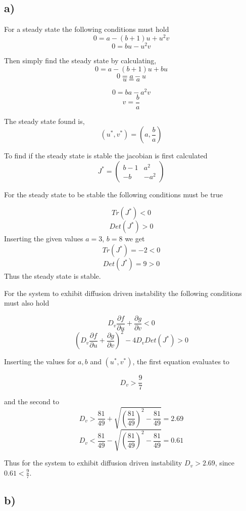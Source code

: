 \subsection{a)}
For a steady state the following conditions must hold
$$0 = a - (b+1)u + u^2v$$
$$0 = bu - u^2v$$

Then simply find the steady state by calculating,
$$0 = a-(b+1)u +bu$$
$$0 = a - u$$
$$u = a$$

$$0 = ba - a^2v$$
$$v = \frac{b}{a}$$

The steady state found is,
$$(u^*, v^*)=\left(a,\frac{b}{a}\right)$$

To find if the steady state is stable the jacobian is first calculated
$$J^* = \left(
\begin{array}{cc}
    b-1 & a^2 \\
    -b  & -a^2
\end{array}
\right)$$

For the steady state to be stable the following conditions must be true

$$Tr(J^*) < 0$$
$$Det(J^*) > 0$$
Inserting the given values $a=3$, $b=8$ we get
$$Tr(J^*) = -2 < 0$$
$$Det(J^*) = 9 > 0$$
Thus the steady state is stable.

For the system to exhibit diffusion driven instability the following conditions must also hold

$$D_v \frac{\partial f}{\partial u} + \frac{\partial g}{\partial v} < 0$$
$$(D_v \frac{\partial f}{\partial u}+ \frac{\partial g}{\partial v})^2 - 4D_v Det(J^*) > 0$$

Inserting the values for $a, b$ and $(u^*, v^*)$, the first equation evaluates to

$$D_v > \frac{9}{7}$$

and the second to
$$D_v > \frac{81}{49} + \sqrt{\left(\frac{81}{49}\right)^2 - \frac{81}{49}} = 2.69$$
$$D_v < \frac{81}{49} - \sqrt{\left(\frac{81}{49}\right)^2 - \frac{81}{49}} = 0.61$$

Thus for the system to exhibit diffusion driven instability $D_v > 2.69$, since $0.61 < \frac{9}{7}$.


\subsection{b)}

